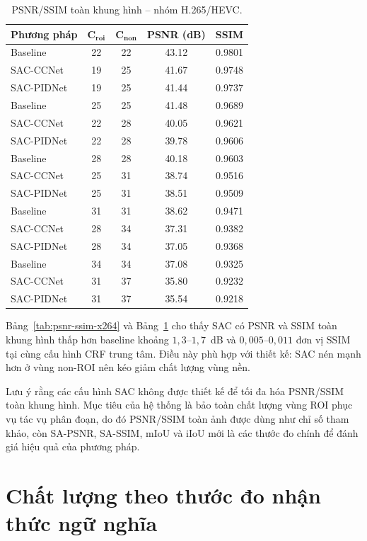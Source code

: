 \begin{table}[H]
\centering
\caption[PSNR/SSIM -- H.265/HEVC]{PSNR/SSIM toàn khung hình -- nhóm H.265/HEVC.}
\label{tab:psnr-ssim-x265}
\small
\begin{tabular}{p{}cccc}
\toprule
\textbf{Phương pháp} & $\boldsymbol{C_{roi}}$ & $\boldsymbol{C_{non}}$ & \textbf{PSNR (dB)} & \textbf{SSIM} \\
\midrule
Baseline & 22 & 22 & 43.12 & 0.9801 \\
SAC-CCNet & 19 & 25 & 41.67 & 0.9748 \\
SAC-PIDNet & 19 & 25 & 41.44 & 0.9737 \\
\midrule
Baseline & 25 & 25 & 41.48 & 0.9689 \\
SAC-CCNet & 22 & 28 & 40.05 & 0.9621 \\
SAC-PIDNet & 22 & 28 & 39.78 & 0.9606 \\
\midrule
Baseline & 28 & 28 & 40.18 & 0.9603 \\
SAC-CCNet & 25 & 31 & 38.74 & 0.9516 \\
SAC-PIDNet & 25 & 31 & 38.51 & 0.9509 \\
\midrule
Baseline & 31 & 31 & 38.62 & 0.9471 \\
SAC-CCNet & 28 & 34 & 37.31 & 0.9382 \\
SAC-PIDNet & 28 & 34 & 37.05 & 0.9368 \\
\midrule
Baseline & 34 & 34 & 37.08 & 0.9325 \\
SAC-CCNet & 31 & 37 & 35.80 & 0.9232 \\
SAC-PIDNet & 31 & 37 & 35.54 & 0.9218 \\
\bottomrule
\end{tabular}
\end{table}

Bảng~\ref{tab:psnr-ssim-x264} và Bảng~\ref{tab:psnr-ssim-x265} cho thấy SAC có PSNR và SSIM toàn khung hình thấp hơn baseline khoảng $1{,}3$--$1{,}7$~dB và $0{,}005$--$0{,}011$ đơn vị SSIM tại cùng cấu hình CRF trung tâm. Điều này phù hợp với thiết kế: SAC nén mạnh hơn ở vùng non-ROI nên kéo giảm chất lượng vùng nền.

Lưu ý rằng các cấu hình SAC không được thiết kế để tối đa hóa PSNR/SSIM toàn khung hình. Mục tiêu của hệ thống là bảo toàn chất lượng vùng ROI phục vụ tác vụ phân đoạn, do đó PSNR/SSIM toàn ảnh được dùng như chỉ số tham khảo, còn SA-PSNR, SA-SSIM, mIoU và iIoU mới là các thước đo chính để đánh giá hiệu quả của phương pháp.

\section{Chất lượng theo thước đo nhận thức ngữ nghĩa}
\label{sec:sa-quality}


